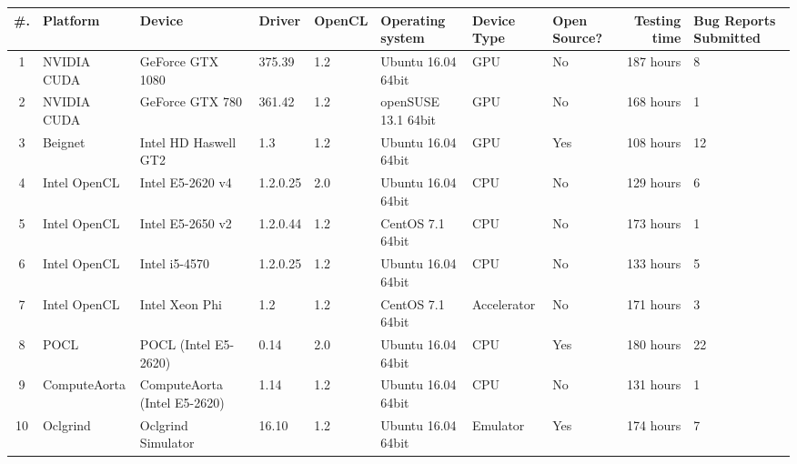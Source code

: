 \begin{tabular}{ cllllllL{1cm} | rR{1.4cm} }
\toprule
\textbf{\#. } & \textbf{Platform} & \textbf{Device} & \textbf{Driver} & \textbf{OpenCL} & 
\textbf{Operating system} & \textbf{Device Type} & \textbf{Open Source?} & \textbf{Testing time} & \textbf{Bug Reports Submitted} \\
 & NVIDIA CUDA & GeForce GTX 1080 & 375.39 & 1.2 & Ubuntu 16.04 64bit & GPU & No & 187 hours & 8 \\
2 & NVIDIA CUDA & GeForce GTX 780 & 361.42 & 1.2 & openSUSE  13.1 64bit & GPU & No & 168 hours & 1 \\
3 & Beignet & Intel HD Haswell GT2 & 1.3 & 1.2 & Ubuntu 16.04 64bit & GPU & Yes & 108 hours & 12 \\
4 & Intel OpenCL & Intel E5-2620 v4 & 1.2.0.25 & 2.0 & Ubuntu 16.04 64bit & CPU & No & 129 hours & 6 \\
5 & Intel OpenCL & Intel E5-2650 v2 & 1.2.0.44 & 1.2 & CentOS 7.1 64bit & CPU & No & 173 hours & 1 \\
6 & Intel OpenCL & Intel i5-4570 & 1.2.0.25 & 1.2 & Ubuntu 16.04 64bit & CPU & No & 133 hours & 5 \\
7 & Intel OpenCL & Intel Xeon Phi & 1.2 & 1.2 & CentOS 7.1 64bit & Accelerator & No & 171 hours & 3 \\
8 & POCL & POCL (Intel E5-2620) & 0.14 & 2.0 & Ubuntu 16.04 64bit & CPU & Yes & 180 hours & 22 \\
9 & ComputeAorta & ComputeAorta (Intel E5-2620) & 1.14 & 1.2 & Ubuntu 16.04 64bit & CPU & No & 131 hours & 1 \\
10 & Oclgrind & Oclgrind Simulator & 16.10 & 1.2 & Ubuntu 16.04 64bit & Emulator & Yes & 174 hours & 7 \\

\bottomrule
\end{tabular}

